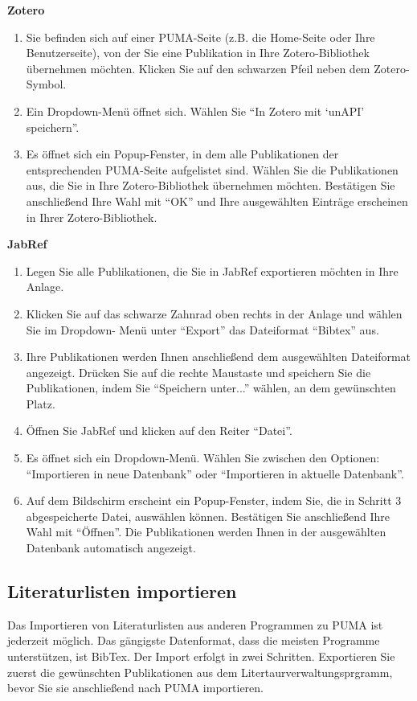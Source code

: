 \documentclass[a4paper,11pt,twoside]{scrbook}
\begin{document}
\textbf{Zotero}
\begin{enumerate}
    \item Sie befinden sich auf einer PUMA-Seite (z.B. die Home-Seite oder Ihre Benutzerseite), von der Sie eine Publikation in Ihre Zotero-Bibliothek übernehmen möchten. Klicken Sie auf den schwarzen Pfeil neben dem Zotero-Symbol.
    \item Ein Dropdown-Menü öffnet sich. Wählen Sie \enquote{In Zotero mit \enquote{unAPI} speichern}.
    \item Es öffnet sich ein Popup-Fenster, in dem alle Publikationen der entsprechenden PUMA-Seite aufgelistet sind. Wählen Sie die Publikationen aus, die Sie in Ihre Zotero-Bibliothek übernehmen möchten. Bestätigen Sie anschließend Ihre Wahl mit \enquote{OK} und Ihre ausgewählten Einträge erscheinen in Ihrer Zotero-Bibliothek.
\end{enumerate} 
\textbf{JabRef}
\begin{enumerate}
    \item Legen Sie alle Publikationen, die Sie in JabRef exportieren möchten in Ihre Anlage.
    \item Klicken Sie auf das schwarze Zahnrad oben rechts in der Anlage und wählen Sie im Dropdown- Menü unter \enquote{Export} das Dateiformat \enquote{Bibtex} aus.
    \item Ihre Publikationen werden Ihnen anschließend dem ausgewählten Dateiformat angezeigt. Drücken Sie auf die rechte Maustaste und speichern Sie die Publikationen, indem Sie \enquote{Speichern unter...} wählen, an dem gewünschten Platz. 
    \item Öffnen Sie JabRef und klicken auf den Reiter \enquote{Datei}. 
    \item Es öffnet sich ein Dropdown-Menü. Wählen Sie zwischen den Optionen: \enquote{Importieren in neue Datenbank} oder \enquote{Importieren in aktuelle Datenbank}.
    \item Auf dem Bildschirm erscheint ein Popup-Fenster, indem Sie, die in Schritt 3 abgespeicherte Datei, auswählen können. Bestätigen Sie anschließend Ihre Wahl mit \enquote{Öffnen}. Die Publikationen werden Ihnen in der ausgewählten Datenbank automatisch angezeigt.
\end{enumerate}

\subsection{Literaturlisten importieren}
Das Importieren von Literaturlisten aus anderen Programmen zu PUMA ist jederzeit möglich. Das gängigste Datenformat, dass die meisten Programme unterstützen, ist BibTex. \newline 
Der Import erfolgt in zwei Schritten. Exportieren Sie zuerst die gewünschten Publikationen aus dem Litertaurverwaltungsprgramm, bevor Sie sie anschließend nach PUMA importieren. 
\end{document}
